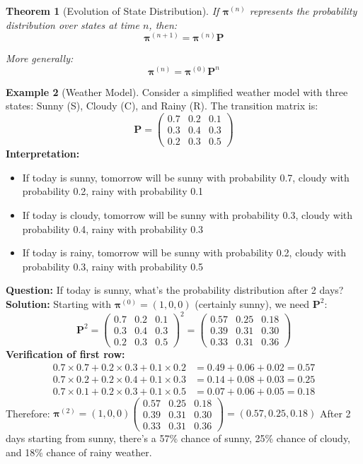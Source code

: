 \documentclass[12pt]{article}
\numberwithin{equation}{section}
\newcommand{\vect}[1]{\boldsymbol{#1}}   %
\newcommand{\mat}[1]{\mathbf{#1}}        %
\theoremstyle{plain}
\newtheorem{theorem}{Theorem}[section]
\theoremstyle{definition}
\newtheorem{example}[theorem]{Example}
\theoremstyle{remark}
\begin{document}
\begin{theorem}[Evolution of State Distribution]
If $\vect{\pi}^{(n)}$ represents the probability distribution over states at time $n$, then:
$$\vect{\pi}^{(n+1)} = \vect{\pi}^{(n)}\mat{P}$$

More generally:
$$\vect{\pi}^{(n)} = \vect{\pi}^{(0)}\mat{P}^n$$
\end{theorem}

\begin{example}[Weather Model]
Consider a simplified weather model with three states: Sunny (S), Cloudy (C), and Rainy (R). The transition matrix is:
$$\mat{P} = \begin{pmatrix} 
0.7 & 0.2 & 0.1 \\
0.3 & 0.4 & 0.3 \\
0.2 & 0.3 & 0.5
\end{pmatrix}$$
\textbf{Interpretation:}
\begin{itemize}
\item If today is sunny, tomorrow will be sunny with probability 0.7, cloudy with probability 0.2, rainy with probability 0.1
\item If today is cloudy, tomorrow will be sunny with probability 0.3, cloudy with probability 0.4, rainy with probability 0.3
\item If today is rainy, tomorrow will be sunny with probability 0.2, cloudy with probability 0.3, rainy with probability 0.5
\end{itemize}
\textbf{Question:} If today is sunny, what's the probability distribution after 2 days?
\textbf{Solution:} Starting with $\vect{\pi}^{(0)} = (1, 0, 0)$ (certainly sunny), we need $\mat{P}^2$:
$$\mat{P}^2 = \begin{pmatrix} 
0.7 & 0.2 & 0.1 \\
0.3 & 0.4 & 0.3 \\
0.2 & 0.3 & 0.5
\end{pmatrix}^2 = \begin{pmatrix}
0.57 & 0.25 & 0.18 \\
0.39 & 0.31 & 0.30 \\
0.33 & 0.31 & 0.36
\end{pmatrix}$$
\textbf{Verification of first row:}
\begin{align}
0.7 \times 0.7 + 0.2 \times 0.3 + 0.1 \times 0.2 &= 0.49 + 0.06 + 0.02 = 0.57\\
0.7 \times 0.2 + 0.2 \times 0.4 + 0.1 \times 0.3 &= 0.14 + 0.08 + 0.03 = 0.25\\
0.7 \times 0.1 + 0.2 \times 0.3 + 0.1 \times 0.5 &= 0.07 + 0.06 + 0.05 = 0.18
\end{align}
Therefore: $\vect{\pi}^{(2)} = (1, 0, 0)\begin{pmatrix}
0.57 & 0.25 & 0.18 \\
0.39 & 0.31 & 0.30 \\
0.33 & 0.31 & 0.36
\end{pmatrix} = (0.57, 0.25, 0.18)$
After 2 days starting from sunny, there's a 57\% chance of sunny, 25\% chance of cloudy, and 18\% chance of rainy weather.
\end{example}
\end{document}
